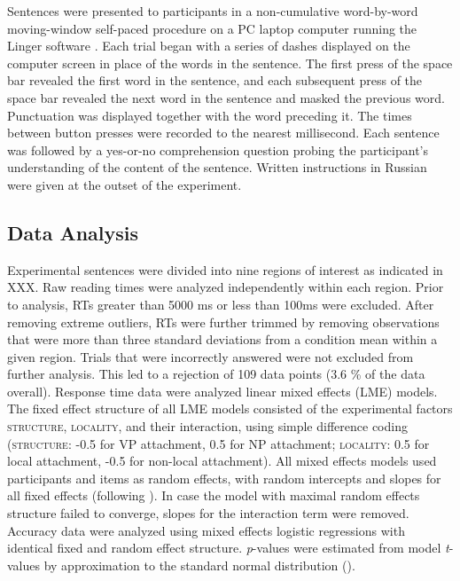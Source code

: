 \documentclass[12pt]{article}
\begin{document}
Sentences were presented to participants in a non-cumulative
word-by-word moving-window self-paced procedure on a PC laptop
computer running the Linger software \citep{rohde:lingermanual}. Each
trial began with a series of dashes displayed on the computer screen
in place of the words in the sentence. The first press of the space
bar revealed the first word in the sentence, and each subsequent press
of the space bar revealed the next word in the sentence and masked the
previous word. Punctuation was displayed together with the word
preceding it.  The times between button presses were recorded to the
nearest millisecond.  Each sentence was followed by a yes-or-no
comprehension question probing the participant's understanding of the
content of the sentence.  Written instructions in Russian were given
at the outset of the experiment.

\subsection{Data Analysis}
\label{sec:analysis}

Experimental sentences were divided into nine regions of interest as indicated in XXX. Raw reading times were analyzed independently within each region. Prior to analysis, RTs greater than 5000 ms or less than 100ms were excluded. After removing extreme outliers, RTs were further trimmed by removing observations that were more than three standard deviations from a condition mean within a given region. Trials that were incorrectly answered were not excluded from further analysis. This led to a rejection of 109 data points (3.6 \% of the data overall). Response time data were analyzed linear mixed effects (LME) models. The fixed effect structure of all LME models consisted of the experimental factors \textsc{structure}, \textsc{locality}, and their interaction, using simple difference coding (\textsc{structure}: -0.5 for VP attachment,  0.5 for NP attachment;  \textsc{locality}: 0.5 for local attachment, -0.5 for non-local attachment). All mixed effects models used participants and items as random effects, with random intercepts and slopes for all fixed effects (following \cite{barr2013}). In case the model with maximal random effects structure failed to converge, slopes for the interaction term were removed. Accuracy data were analyzed using mixed effects logistic regressions with identical fixed and random effect structure. \textit{p}-values were estimated from model \textit{t}-values by approximation to the standard normal distribution (\cite{baayen2008}).   
  
\end{document}
